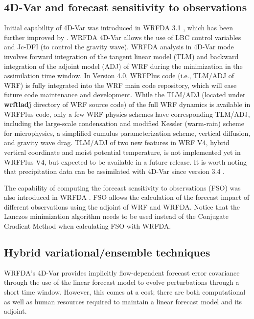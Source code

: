 \subsection{4D-Var and forecast sensitivity to observations}

Initial capability of 4D-Var was introduced in WRFDA 3.1 \citep{huang09}, which has been further
improved by \citet{zhang13, zhang14a}. WRFDA 4D-Var allows the use of LBC control variables and Jc-DFI 
(to control the gravity wave). WRFDA analysis in 4D-Var mode involves forward integration of the
tangent linear model (TLM) and backward integration of the adjoint model (ADJ) of WRF during the minimization in the assimilation time window. 
In Version 4.0, WRFPlus code (i.e., TLM/ADJ of WRF) is fully integrated into the WRF main code repository, 
which will ease future code maintenance
and development. While the TLM/ADJ (located under {\bf wrftladj} directory of WRF source code) of the full 
WRF dynamics is available in WRFPlus code, only a few WRF physics schemes have corresponding TLM/ADJ, including
the large-scale condensation and modified Kessler (warm-rain) \citep{wang13b} scheme for microphysics, a simplified
cumulus parameterization scheme, vertical diffusion, and gravity wave drag. TLM/ADJ of two new features in WRF V4, 
hybrid vertical coordinate and moist potential temperature, is not implemented yet in WRFPlus V4, but expected to
be available in a future release.
It is worth noting that precipitation data can be assimilated with 4D-Var since version 3.4 \citep{ban17}.

The capability of computing the forecast sensitivity to observations (FSO) was also introduced in WRFDA \citep{zhang15}. 
FSO allows the calculation of the forecast impact of different observations using the adjoint of WRF and WRFDA. 
Notice that the Lanczos minimization algorithm needs to be used instead of the Conjugate Gradient Method when calculating FSO
with WRFDA.

\subsection{Hybrid variational/ensemble techniques}

WRFDA's 4D-Var provides implicitly flow-dependent forecast error covariance
through the use of the linear forecast model to evolve perturbations through a short time window. 
However, this comes at a cost; there are both computational as well as human resources
required to maintain a linear forecast model and its adjoint. 

